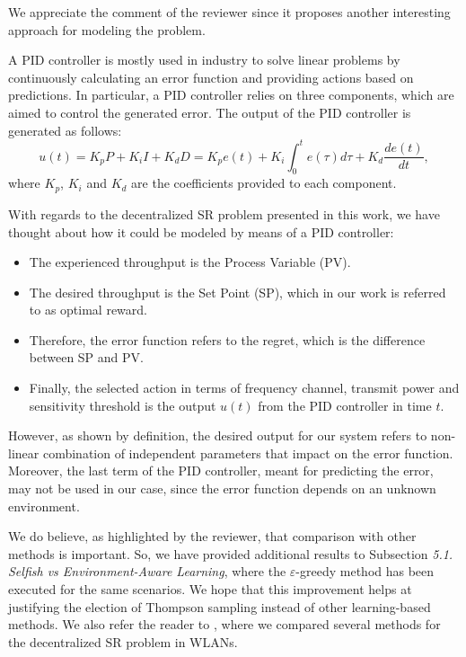 \documentclass[a4paper,twoside,11pt]{reviewresponse}
\begin{document}
	We appreciate the comment of the reviewer since it proposes another interesting approach for modeling the problem. 
	
	A PID controller is mostly used in industry to solve linear problems by continuously calculating an error function and providing actions based on predictions. In particular, a PID controller relies on three components, which are aimed to control the generated error. The output of the PID controller is generated as follows:
	\begin{equation}
	    u(t) =  K_p P + K_i I + K_d D = K_p e(t) + K_i \int_{0}^{t} e(\tau) d \tau + K_d \frac{d e(t)}{dt},
	\end{equation}
	where $K_p$, $K_i$ and $K_d$ are the coefficients provided to each component.

	With regards to the decentralized SR problem presented in this work, we have thought about how it could be modeled by means of a PID controller:
	\begin{itemize}
	    \item The experienced throughput is the Process Variable (PV).
        \item The desired throughput is the Set Point (SP), which in our work is referred to as optimal reward.
        \item Therefore, the error function refers to the regret, which is the difference between SP and PV.
        \item Finally, the selected action in terms of frequency channel, transmit power and sensitivity threshold is the output $u(t)$ from the PID controller in time $t$.
	\end{itemize}
	
    However, as shown by definition, the desired output for our system refers to  non-linear combination of independent parameters that impact on the error function. Moreover, the last term of the PID controller, meant for predicting the error, may not be used in our case, since the error function depends on an unknown environment.
    
    We do believe, as highlighted by the reviewer, that comparison with other methods is important. So, we have provided additional results to Subsection \textit{5.1. Selfish vs Environment-Aware Learning}, where the $\varepsilon$-greedy method has been executed for the same scenarios. We hope that this improvement helps at justifying the election of Thompson sampling instead of other learning-based methods. We also refer the reader to \cite{wilhelmi2017collaborative}, where we compared several methods for the decentralized SR problem in WLANs.
\end{document}
